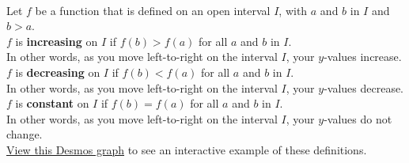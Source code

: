 \begin{myDefinition}~\\[0.5mm]
\begin{minipage}{0.9\linewidth}
Let $f$ be a function that is defined on an open interval $I$, with $a$ and $b$ in $I$ and $b>a$.  \\


$f$ is {\bf increasing} on $I$ if $f(b)>f(a)$ for all $a$ and $b$ in $I$.\\
In other words, as you move left-to-right on the interval $I$, your $y$-values increase.\\

$f$ is {\bf decreasing} on $I$ if $f(b)<f(a)$ for all $a$ and $b$ in $I$.\\
In other words, as you move left-to-right on the interval $I$, your $y$-values decrease.\\

$f$ is {\bf constant} on $I$ if $f(b)=f(a)$ for all $a$ and $b$ in $I$.\\
In other words, as you move left-to-right on the interval $I$, your $y$-values do not change.\\[0.4em]
 \href{https://tiny.cc/111Z-IncDec}{View this Desmos graph} to see an interactive example of these definitions. %
\end{minipage}
\begin{minipage}{0.1\linewidth}
\flushright {}
\end{minipage}
\end{myDefinition}


